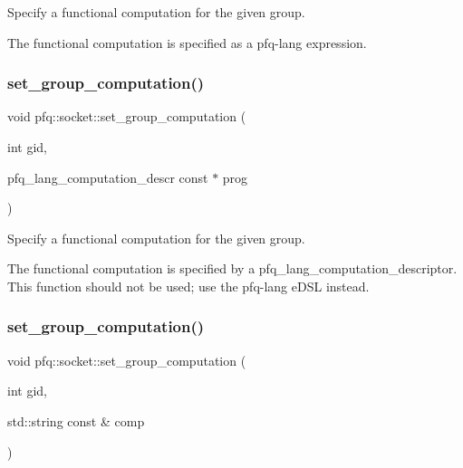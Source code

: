 Specify a functional computation for the given group. 

The functional computation is specified as a pfq-\/lang expression. \mbox{\label{classpfq_1_1socket_a5f0ff8e78f374974ae32753c313e931c}} 
\subsubsection{\texorpdfstring{set\+\_\+group\+\_\+computation()}{set\_group\_computation()}\hspace{0.1cm}{\footnotesize\ttfamily [2/4]}}
{\footnotesize\ttfamily void pfq\+::socket\+::set\+\_\+group\+\_\+computation (\begin{DoxyParamCaption}\item[{int}]{gid,  }\item[{pfq\+\_\+lang\+\_\+computation\+\_\+descr const $\ast$}]{prog }\end{DoxyParamCaption})\hspace{0.3cm}{\ttfamily [inline]}}



Specify a functional computation for the given group. 

The functional computation is specified by a pfq\+\_\+lang\+\_\+computation\+\_\+descriptor. This function should not be used; use the pfq-\/lang e\+D\+SL instead. \mbox{\label{classpfq_1_1socket_aa326867f9a3ca1391158161ff54d564c}} 
\subsubsection{\texorpdfstring{set\+\_\+group\+\_\+computation()}{set\_group\_computation()}\hspace{0.1cm}{\footnotesize\ttfamily [3/4]}}
{\footnotesize\ttfamily void pfq\+::socket\+::set\+\_\+group\+\_\+computation (\begin{DoxyParamCaption}\item[{int}]{gid,  }\item[{std\+::string const \&}]{comp }\end{DoxyParamCaption})\hspace{0.3cm}{\ttfamily [inline]}}



